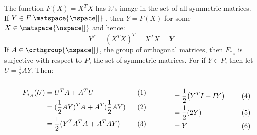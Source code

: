 \documentclass[oneside]{book}                                                  %
\begin{document}
                The function $F(X)=X^{T}X$ has it's image in the set of all
                symmetric matrices. If $Y\in{F}[\matspace{\nspace[]}]$, then
                $Y=F(X)$ for some $X\in\matspace{\nspace[]}$ and hence:
                \begin{equation}
                    Y^{T}=(X^{T}X)^{T}=X^{T}X=Y
                \end{equation}
                If $A\in\orthgroup{\nspace[]}$, the group of orthogonal
                matrices, then $F_{*_{A}}$ is surjective with respect to $P$,
                the set of symmetric matrices. For if $Y\in{P}$, then let
                $U=\frac{1}{2}AY$. Then:
                \begin{subequations}
                    \begin{minipage}[b]{0.56\textwidth}
                        \centering
                        \begin{align}
                            F_{*_{A}}(U)&=U^{T}A+A^{T}U\\
                                &=(\frac{1}{2}AY)^{T}A+A^{T}(\frac{1}{2}AY)\\
                                &=\frac{1}{2}\big(Y^{T}A^{T}A+A^{T}AY\big)
                        \end{align}
                    \end{minipage}
                    \hfill
                    \begin{minipage}[b]{0.43\textwidth}
                        \centering
                        \begin{align}
                            &=\frac{1}{2}\big(Y^{T}I+IY\big)\\
                            &=\frac{1}{2}(2Y)\\
                            &=Y
                        \end{align}
                    \end{minipage}
                \end{subequations}
\end{document}
